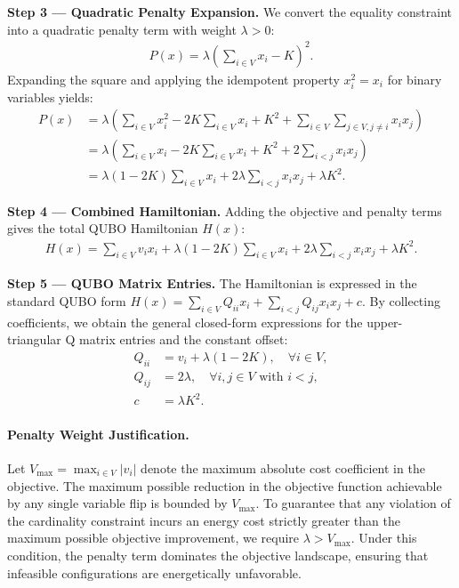 \documentclass[12pt]{article}
\begin{document}
\textbf{Step 3 --- Quadratic Penalty Expansion.} We convert the equality constraint into a quadratic penalty term with weight $\lambda > 0$:
\begin{align}
    P(x) = \lambda \left( \sum_{i \in V} x_i - K \right)^2.
\end{align}
Expanding the square and applying the idempotent property $x_i^2 = x_i$ for binary variables yields:
\begin{align}
    P(x) &= \lambda \left( \sum_{i \in V} x_i^2 - 2K \sum_{i \in V} x_i + K^2 + \sum_{i \in V} \sum_{j \in V, j \neq i} x_i x_j \right) \\
    &= \lambda \left( \sum_{i \in V} x_i - 2K \sum_{i \in V} x_i + K^2 + 2 \sum_{i < j} x_i x_j \right) \\
    &= \lambda (1 - 2K) \sum_{i \in V} x_i + 2\lambda \sum_{i < j} x_i x_j + \lambda K^2.
\end{align}

\textbf{Step 4 --- Combined Hamiltonian.} Adding the objective and penalty terms gives the total QUBO Hamiltonian $H(x)$:
\begin{align}
    H(x) = \sum_{i \in V} v_i x_i + \lambda (1 - 2K) \sum_{i \in V} x_i + 2\lambda \sum_{i < j} x_i x_j + \lambda K^2.
\end{align}

\textbf{Step 5 --- QUBO Matrix Entries.} The Hamiltonian is expressed in the standard QUBO form $H(x) = \sum_{i \in V} Q_{ii} x_i + \sum_{i < j} Q_{ij} x_i x_j + c$. By collecting coefficients, we obtain the general closed-form expressions for the upper-triangular Q matrix entries and the constant offset:
\begin{align}
    Q_{ii} &= v_i + \lambda (1 - 2K), \quad \forall i \in V, \\
    Q_{ij} &= 2\lambda, \quad \forall i, j \in V \text{ with } i < j, \\
    c &= \lambda K^2.
\end{align}

\paragraph{Penalty Weight Justification.}
Let $V_{\max} = \max_{i \in V} |v_i|$ denote the maximum absolute cost coefficient in the objective. The maximum possible reduction in the objective function achievable by any single variable flip is bounded by $V_{\max}$. To guarantee that any violation of the cardinality constraint incurs an energy cost strictly greater than the maximum possible objective improvement, we require $\lambda > V_{\max}$. Under this condition, the penalty term dominates the objective landscape, ensuring that infeasible configurations are energetically unfavorable.
\end{document}
